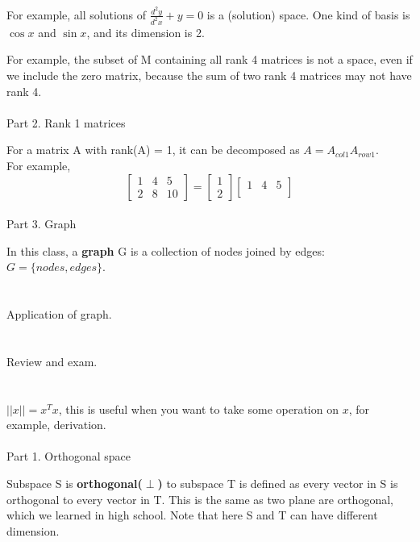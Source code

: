 \documentclass{article}
\begin{document}
\begin{spacing}{1.5}
For example, all solutions of $\frac{d^2y}{d^2x}+y=0$ is a (solution) space. One kind of basis is $\cos x$ and $\sin x$, and its dimension is 2.

For example, the subset of M containing all rank 4 matrices is not a space, even if we include the zero matrix, because the sum of two rank 4 matrices may not have rank 4.
\\\\ Part 2. Rank 1 matrices

For a matrix A with rank(A) = 1, it can be decomposed as $A = A_{col1} A_{row1}$.\\
For example,
$$
\begin{bmatrix}
1 & 4 & 5 \\
2 & 8 & 10
\end{bmatrix}
= 
\begin{bmatrix}
1 \\
2 
\end{bmatrix}
\begin{bmatrix}
1 & 4 & 5\\
\end{bmatrix}
$$
\\Part 3. Graph

In this class, a {\bfseries graph} G is a collection of nodes joined by edges: 
$G = \{nodes, edges\}$. 



\section{}
\hspace*{0.5cm}Application of graph.


\section{}
\hspace*{0.5cm} Review and exam.


\section{}
\hspace*{0.5cm} $||x||=x^Tx$, this is useful when you want to take some operation on $x$, for example, derivation.
\\\\Part 1. Orthogonal space

Subspace S is {\bfseries orthogonal($\perp$)} to subspace T is defined as every vector in S is orthogonal to every vector in T. This is the same as two plane are orthogonal, which we learned in high school. Note that here S and T can have different dimension.


\end{spacing}
\end{document}

